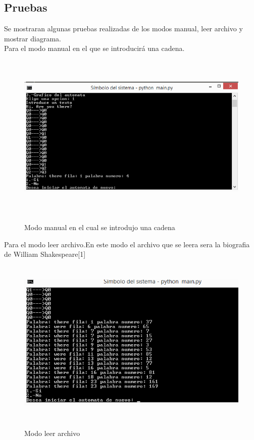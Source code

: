 \documentclass[12pt,letterpaper]{article}
\begin{document}
\subsection{Pruebas}
Se mostraran algunas pruebas realizadas de los modos manual, leer archivo y mostrar diagrama.\\
Para el modo manual en el que se introducir\'a una cadena.
\begin{figure}[H]
\includegraphics[width=\textwidth, height=8cm]{manualERE.png}
\label{fig:manualautomataere}
\caption{Modo manual en el cual se introdujo una cadena}
\end{figure}

Para el modo leer archivo.En este modo el archivo que se leera sera la biografia de William Shakespeare[1]\\

\begin{figure}[H]
\includegraphics[width=\textwidth, height=8cm]{leerERE.png}
\label{fig:leerautomataere}
\caption{Modo leer archivo}
\end{figure}
\end{document}
